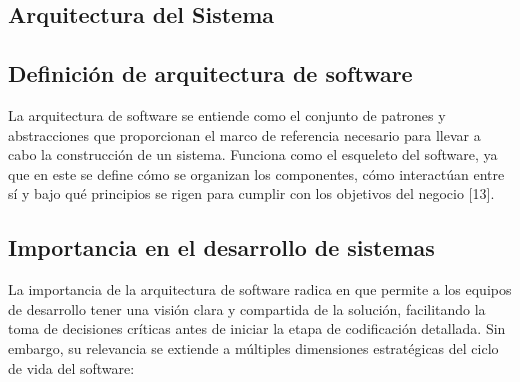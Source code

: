 \subsection{Arquitectura del Sistema}

\begin{flushleft}
\section{Definición de arquitectura de software}
\end{flushleft}
\justifying
La arquitectura de software se entiende como el conjunto de patrones y abstracciones que proporcionan el marco de referencia necesario para llevar a cabo la construcción de un sistema. Funciona como el esqueleto del software, ya que en este se define cómo se organizan los componentes, cómo interactúan entre sí y bajo qué principios se rigen para cumplir con los objetivos del negocio [13]. 
\subsection{Importancia en el desarrollo de sistemas}

La importancia de la arquitectura de software radica en que permite a los equipos de desarrollo tener una visión clara y compartida de la solución, facilitando la toma de decisiones críticas antes de iniciar la etapa de codificación detallada. Sin embargo, su relevancia se extiende a múltiples dimensiones estratégicas del ciclo de vida del software:

